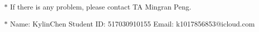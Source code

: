 \documentclass[12pt,a4paper]{article}
\theoremstyle{definition}
\begin{document}
\noindent

\noindent{}


\begin{center}
\footnotesize{\color{red}$*$ If there is any problem, please contact TA Mingran Peng.}\par
\footnotesize{\color{blue}$*$ Name: KylinChen \quad Student ID: 517030910155 \quad Email: k1017856853@icloud.com}
\end{center}
\begin{enumerate}
    


\end{enumerate}
\end{document}
